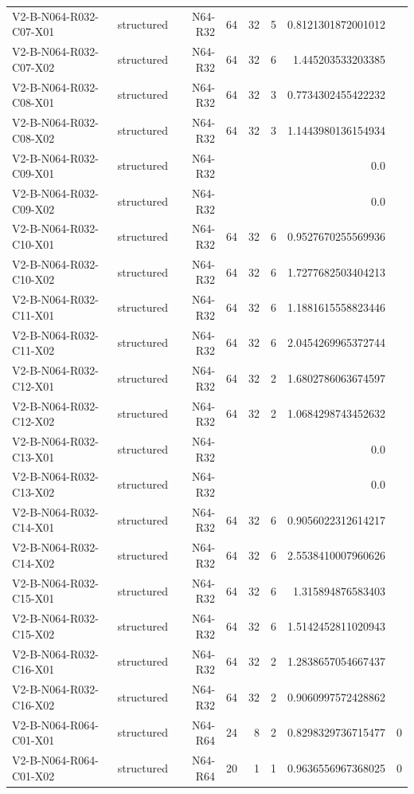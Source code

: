 {\begin{longtable}{lrrrrrrr}
V2-B-N064-R032-C07-X01 & structured & N64-R32 & 64 & 32 & 5 & 0.8121301872001012 &  \\
V2-B-N064-R032-C07-X02 & structured & N64-R32 & 64 & 32 & 6 & 1.445203533203385 &  \\
V2-B-N064-R032-C08-X01 & structured & N64-R32 & 64 & 32 & 3 & 0.7734302455422232 &  \\
V2-B-N064-R032-C08-X02 & structured & N64-R32 & 64 & 32 & 3 & 1.1443980136154934 &  \\
V2-B-N064-R032-C09-X01 & structured & N64-R32 &  &  &  & 0.0 &  \\
V2-B-N064-R032-C09-X02 & structured & N64-R32 &  &  &  & 0.0 &  \\
V2-B-N064-R032-C10-X01 & structured & N64-R32 & 64 & 32 & 6 & 0.9527670255569936 &  \\
V2-B-N064-R032-C10-X02 & structured & N64-R32 & 64 & 32 & 6 & 1.7277682503404213 &  \\
V2-B-N064-R032-C11-X01 & structured & N64-R32 & 64 & 32 & 6 & 1.1881615558823446 &  \\
V2-B-N064-R032-C11-X02 & structured & N64-R32 & 64 & 32 & 6 & 2.0454269965372744 &  \\
V2-B-N064-R032-C12-X01 & structured & N64-R32 & 64 & 32 & 2 & 1.6802786063674597 &  \\
V2-B-N064-R032-C12-X02 & structured & N64-R32 & 64 & 32 & 2 & 1.0684298743452632 &  \\
V2-B-N064-R032-C13-X01 & structured & N64-R32 &  &  &  & 0.0 &  \\
V2-B-N064-R032-C13-X02 & structured & N64-R32 &  &  &  & 0.0 &  \\
V2-B-N064-R032-C14-X01 & structured & N64-R32 & 64 & 32 & 6 & 0.9056022312614217 &  \\
V2-B-N064-R032-C14-X02 & structured & N64-R32 & 64 & 32 & 6 & 2.5538410007960626 &  \\
V2-B-N064-R032-C15-X01 & structured & N64-R32 & 64 & 32 & 6 & 1.315894876583403 &  \\
V2-B-N064-R032-C15-X02 & structured & N64-R32 & 64 & 32 & 6 & 1.5142452811020943 &  \\
V2-B-N064-R032-C16-X01 & structured & N64-R32 & 64 & 32 & 2 & 1.2838657054667437 &  \\
V2-B-N064-R032-C16-X02 & structured & N64-R32 & 64 & 32 & 2 & 0.9060997572428862 &  \\
V2-B-N064-R064-C01-X01 & structured & N64-R64 & 24 & 8 & 2 & 0.8298329736715477 & 0 \\
V2-B-N064-R064-C01-X02 & structured & N64-R64 & 20 & 1 & 1 & 0.9636556967368025 & 0 \\

\end{longtable}}
